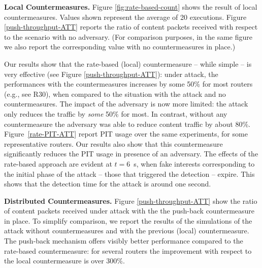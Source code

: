\documentclass[10pt,conference,letterpaper]{IEEEtran}
\newcommand{\descr}[1]{\medskip\noindent\textbf{#1}}
\renewcommand{\paragraph}{\descr}
\begin{document}
\paragraph{Local Countermeasures.} Figure \ref{fig:rate-based-count} shows the result of local countermeasures. Values shown represent the average of 20 executions.
Figure \ref{push-throughput-ATT} reports the ratio of content packets received with respect to the scenario with no adversary. (For comparison purposes, in the same figure we also report the corresponding value with no countermeasures in place.) 






Our results show that the rate-based (local) countermeasure -- while simple -- is very effective (see Figure \ref{push-throughput-ATT}): under attack, the performances with the countermeasures increases by some 50\%  for most routers (e.g., see R30), when compared to the situation with the attack and no countermeasures.
The impact of the adversary  is now more limited: the attack only reduces the traffic by {\em some} 50\% for most. In contrast, without any countermeasure the adversary was able to reduce content traffic by about 80\%.
Figure~\ref{rate-PIT-ATT} report PIT usage over the same experiments, for some representative routers.
Our results also show that this countermeasure significantly reduces the PIT usage in presence of an adversary. The effects of the rate-based approach are evident at $t=6$~s, when fake interests corresponding to the initial phase of the attack -- those that triggered the detection  -- expire. This shows that the detection time for the attack is around one second. 








\paragraph{Distributed Countermeasures.} 
Figure \ref{push-throughput-ATT} show the ratio of content packets received under attack with the the push-back countermeasure in place. 
To simplify comparison, we  report the results of the simulations of the attack without countermeasures and with the previous (local) countermeasure.
The push-back mechanism offers visibly better performance compared to the rate-based countermeasure: 
for several routers the improvement with respect to the local countermeasure is over 300\%.
\end{document}
